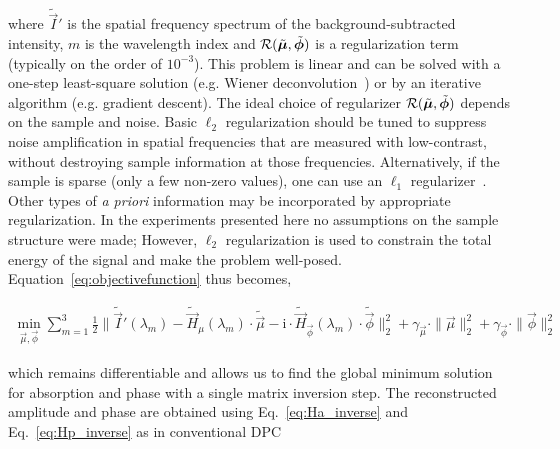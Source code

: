 \noindent where $\tilde{\vec{I}}'$ is the spatial frequency spectrum of the background-subtracted intensity, $m$ is the wavelength index and $\mathcal{R}(\tilde{\bm{\mu}},\tilde{\bm{\phi}})$ is a regularization term (typically on the order of $10^{-3}$). This problem is linear and can be solved with a one-step least-square solution (e.g. Wiener deconvolution~\cite{HayesDSP}) or by an iterative algorithm (e.g. gradient descent). The ideal choice of regularizer $\mathcal{R}(\tilde{\bm{\mu}},\tilde{\bm{\phi}})$ depends on the sample and noise. Basic $\ell_2$ regularization should be tuned to suppress noise amplification in spatial frequencies that are measured with low-contrast, without destroying sample information at those frequencies.
Alternatively, if the sample is sparse (only a few non-zero values), one can use an $\ell_1$ regularizer~\cite{2002_l1_sparsity}. Other types of \textit{a priori} information may be incorporated by appropriate regularization. In the experiments presented here no assumptions on the sample structure were made; However, $\ell_2$ regularization is used to constrain the total energy of the signal and make the problem well-posed. Equation~\ref{eq:objectivefunction} thus becomes,

\begin{equation}\label{eq:objectivefunction2}
\begin{split}
\min_{\vec{\mu},\vec{\phi}} \sum_{m=1}^{3} \frac{1}{2}  \parallel\tilde{\vec{I}}'(\lambda_m) - \tilde{\vec{H}}_{\mu}(\lambda_m)\cdot \tilde{\vec{\mu}} - \mathrm{i}\cdot\tilde{\vec{H}}_{\vec{\phi}}(\lambda_m)\cdot \tilde{\vec{\phi}} \parallel_2^2 + \gamma_{\vec{\mu}}\cdot \parallel \vec{\mu} \parallel^2_2 + \gamma_{\vec{\phi}}\cdot \parallel \vec{\phi}\parallel^2_2
\end{split}
\end{equation}

\noindent which remains differentiable and allows us to find the global minimum solution for absorption and phase with a single matrix inversion step. The reconstructed amplitude and phase are obtained using Eq.~\ref{eq:Ha_inverse} and Eq.~\ref{eq:Hp_inverse} as in conventional DPC

